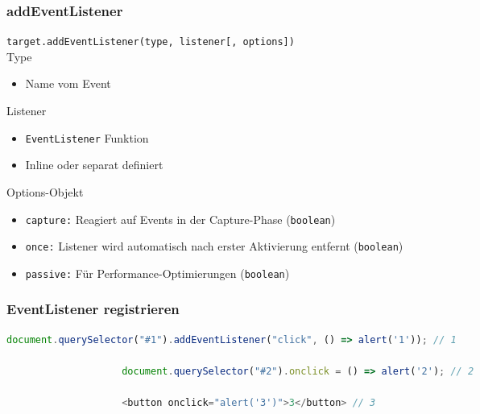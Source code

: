 \documentclass[a4paper, landscape, 8pt]{scrartcl}
\begin{document}
\begin{multicols*}{4}
        \subsubsection{addEventListener}
        {\small\texttt{target.addEventListener(type, listener[, options])}}
        \\
        Type
        \begin{itemize}
            \item Name vom Event
        \end{itemize}
        Listener
        \begin{itemize}
            \item \texttt{EventListener} Funktion
            \item Inline oder separat definiert
        \end{itemize}
        Options-Objekt
        \begin{itemize}
            \item \texttt{capture:} \> Reagiert auf Events in der Capture-Phase (\texttt{boolean})
            \item \texttt{once:} \> Listener wird automatisch nach erster Aktivierung entfernt (\texttt{boolean})
            \item \texttt{passive:} \> Für Performance-Optimierungen (\texttt{boolean})
        \end{itemize}

        \subsubsection{EventListener registrieren}
        \begin{lstlisting}[language=JavaScript]
                    document.querySelector("#1").addEventListener("click", () => alert('1')); // 1

                    document.querySelector("#2").onclick = () => alert('2'); // 2

                    <button onclick="alert('3')">3</button> // 3
        \end{lstlisting}


\end{multicols*}
\end{document}
